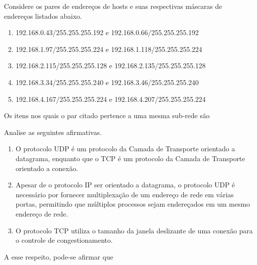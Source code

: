 \documentclass[10pt,a4paper]{article}
\begin{document}
%
{
\def\AMCbeginQuestion#1#2{\par\noindent{\bf (POSCOMP 2007 - Questão 66)}}
\begin{question}{} Considere os pares de endereços de hosts e suas respectivas máscaras de endereços listados abaixo.
\begin{enumerate}[label=\Roman*.]
\item 192.168.0.43/255.255.255.192 e 192.168.0.66/255.255.255.192
\item 192.168.1.97/255.255.255.224 e 192.168.1.118/255.255.255.224
\item 192.168.2.115/255.255.255.128 e 192.168.2.135/255.255.255.128
\item 192.168.3.34/255.255.255.240 e 192.168.3.46/255.255.255.240
\item 192.168.4.167/255.255.255.224 e 192.168.4.207/255.255.255.224
\end{enumerate}
Os itens nos quais o par citado pertence a uma mesma sub-rede são
\begin{choices}
\end{choices}
\end{question}
}
%
{
\def\AMCbeginQuestion#1#2{\par\noindent{\bf (POSCOMP 2007 - Questão 67)}}
\begin{question}{} Analise as seguintes afirmativas.
\begin{enumerate}[label=\Roman*.]
\item O protocolo UDP é um protocolo da Camada de Transporte orientado a datagrama, enquanto que o TCP é um protocolo da Camada de Transporte orientado a conexão.
\item Apesar de o protocolo IP ser orientado a datagrama, o protocolo UDP é necessário por fornecer multiplexação de um endereço de rede em várias portas, permitindo que múltiplos processos sejam endereçados em um mesmo endereço de rede.
\item O protocolo TCP utiliza o tamanho da janela deslizante de uma conexão para o controle de congestionamento.
\end{enumerate}
A esse respeito, pode-se afirmar que
\begin{choices}
\end{choices}
\end{question}
}
\end{document}
